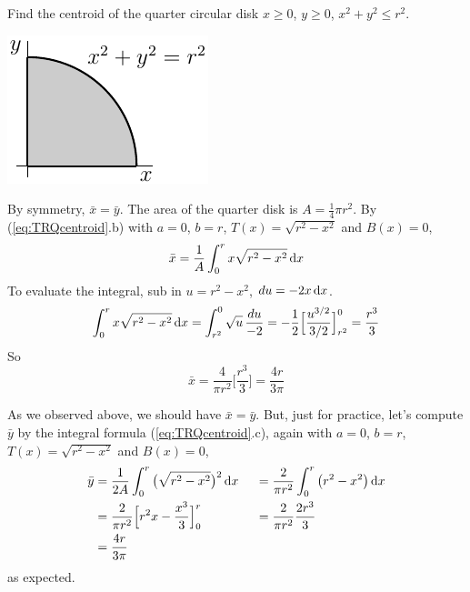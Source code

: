 \goodbreak
\begin{eg}\label{eg:TRQcentroidBa}
  Find the centroid of the quarter circular disk $x\ge 0$,
$y\ge 0$, $x^2+y^2\le r^2$.

\begin{efig}
\begin{center}
    \includegraphics{centroidQuarterCircle}
\end{center}
\end{efig}

\soln  By symmetry, $\bar x=\bar y$. The area of the quarter disk
is $A=\frac{1}{4}\pi r^2$. By (\ref{eq:TRQcentroid}.b) with $a=0$, $b=r$,
$T(x)=\sqrt{r^2-x^2}$ and $B(x)=0$,
\begin{equation*}
\bar x = \frac{1}{A}\int_0^r x\sqrt{r^2-x^2}\,\mathrm{d}x
\end{equation*}
To evaluate the integral, sub in $u=r^2-x^2$, $du=-2x\,\mathrm{d}x$.
\begin{equation}\label{eq:TRQcentroidB}
\int_0^r x\sqrt{r^2-x^2}\,\mathrm{d}x = \int_{r^2}^0 \sqrt{u}\,\frac{du}{-2}
= -\frac{1}{2}\Big[\frac{u^{3/2}}{3/2}\Big]^0_{r^2}
= \frac{r^3}{3}
\end{equation}
So
\begin{equation*}
\bar x
= \frac{4}{\pi r^2}\Big[\frac{r^3}{3}\Big]
=\frac{4r}{3\pi}
\end{equation*}

As we observed above, we should have $\bar x=\bar y$. But, just for practice,
let's compute $\bar y$ by the integral formula (\ref{eq:TRQcentroid}.c),
again with $a=0$, $b=r$, $T(x)=\sqrt{r^2-x^2}$ and $B(x)=0$,
\begin{alignat*}{3}
\bar y & =  \frac{1}{2A}\int_0^r \big(\sqrt{r^2-x^2}\big)^2\,\mathrm{d}x\
 &&=  \frac{2}{\pi r^2}\int_0^r \big(r^2-x^2\big)\,\mathrm{d}x \\
 &=  \frac{2}{\pi r^2}\Big[r^2x-\frac{x^3}{3}\Big]_0^r
 &&=  \frac{2}{\pi r^2}\frac{2r^3}{3} \\
 &=\frac{4r}{3\pi}
\end{alignat*}
as expected.
\end{eg}

